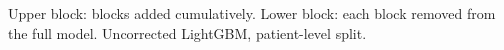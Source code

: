 {\footnotesize Upper block: blocks added cumulatively. Lower block: each block removed from the full model. Uncorrected LightGBM, patient-level split.}
